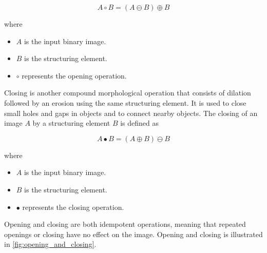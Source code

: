 \begin{equation}
    A \circ B = (A \ominus B) \oplus B
    \label{eq:opening}
\end{equation}

where
\begin{itemize}
    \item $A$ is the input binary image.
    \item $B$ is the structuring element.
    \item $\circ$ represents the opening operation.
\end{itemize}

Closing is another compound morphological operation that consists of dilation followed by an erosion using the same structuring element. It is used to close small holes and gaps in objects and to connect nearby objects. The closing of an image $A$ by a structuring element $B$ is defined as

\begin{equation}
    A \bullet B = (A \oplus B) \ominus B
    \label{eq:closing}
\end{equation}

where
\begin{itemize}
    \item $A$ is the input binary image.
    \item $B$ is the structuring element.
    \item $\bullet$ represents the closing operation.
\end{itemize}

Opening and closing are both idempotent operations, meaning that repeated openings or closing have no effect on the image. Opening and closing is illustrated in \autoref{fig:opening_and_closing}.

